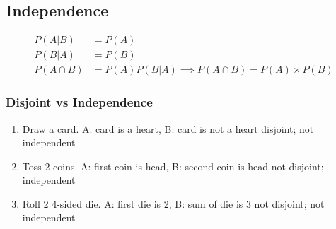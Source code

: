 \subsection{Independence}  %
\begin{align}
    P(A\vert B)&=P(A) \\
    P(B\vert A)&=P(B) \\
    P(A\cap B)&=P(A)P(B\vert A)\implies P(A\cap B)=P(A)\times P(B)
\end{align}
\subsubsection{Disjoint vs Independence}  %
\begin{enumerate}
    \item Draw a card. A: card is a heart, B: card is not a heart
          \subitem disjoint; not independent
    \item Toss 2 coins. A: first coin is head, B: second coin is head
          \subitem not disjoint; independent
    \item Roll 2 4-sided die. A: first die is 2, B: sum of die is 3
          \subitem not disjoint; not independent
\end{enumerate}
